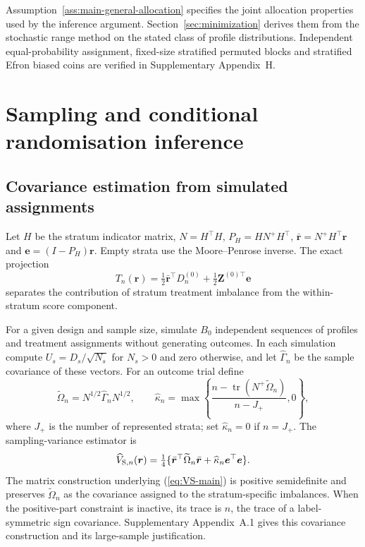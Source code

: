 \documentclass[12pt,a4paper]{article}
\theoremstyle{definition}
\begin{document}
Assumption~\ref{ass:main-general-allocation} specifies the joint allocation properties used by the inference argument. Section~\ref{sec:minimization} derives them from the stochastic range method on the stated class of profile distributions. Independent equal-probability assignment, fixed-size stratified permuted blocks and stratified Efron biased coins are verified in Supplementary Appendix~H.

\section{Sampling and conditional randomisation inference}\label{sec:theory}
\subsection{Covariance estimation from simulated assignments}
Let $H$ be the stratum indicator matrix, $N=H^\top H$, $P_H=HN^+H^\top$, $\bar{\bm r}=N^+H^\top\bm r$ and $\bm e=(I-P_H)\bm r$. Empty strata use the Moore--Penrose inverse. The exact projection
\begin{equation}\label{eq:projection}
 T_n(\bm r)=\tfrac12\bar{\bm r}^{\top}D_n^{(0)}+\tfrac12\bm Z^{(0)\top}\bm e
\end{equation}
separates the contribution of stratum treatment imbalance from the within-stratum score component.

For a given design and sample size, simulate $B_0$ independent sequences of profiles and treatment assignments without generating outcomes. In each simulation compute $U_s=D_s/\sqrt{N_s}$ for $N_s>0$ and zero otherwise, and let $\widehat\Gamma_n$ be the sample covariance of these vectors. For an outcome trial define
\[
 \widetilde\Omega_n=N^{1/2}\widehat\Gamma_n N^{1/2},\qquad
 \widehat\kappa_n=\max\left\{\frac{n-\operatorname{tr}(N^+\widetilde\Omega_n)}{n-J_+},0\right\},
\]
where $J_+$ is the number of represented strata; set $\widehat\kappa_n=0$ if $n=J_+$. The sampling-variance estimator is
\begin{equation}\label{eq:VS-main}
 \widehat V_{{\rm S},n}(\bm r)=
 \tfrac14\{\bar{\bm r}^{\top}\widetilde\Omega_n\bar{\bm r}
                  +\widehat\kappa_n\bm e^\top\bm e\}.
\end{equation}
The matrix construction underlying (\ref{eq:VS-main}) is positive semidefinite and preserves $\widetilde\Omega_n$ as the covariance assigned to the stratum-specific imbalances. When the positive-part constraint is inactive, its trace is $n$, the trace of a label-symmetric sign covariance. Supplementary Appendix~A.1 gives this covariance construction and its large-sample justification.
\end{document}

